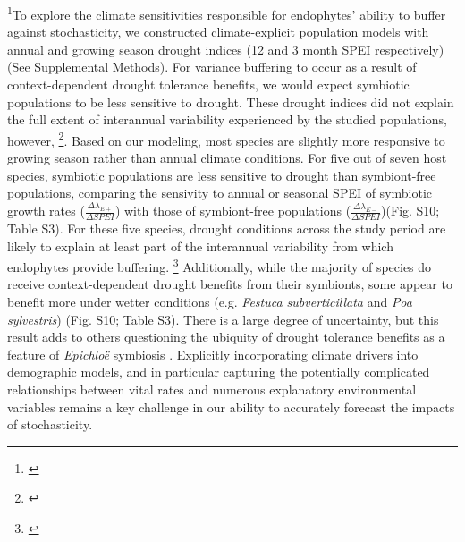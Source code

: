 \documentclass[12pt]{article}
\newcommand{\tom}[2]{{\color{red}{#1}}\footnote{\textit{\color{red}{#2}}}}
\newcommand{\josh}[2]{{\color{blue}{#1}}\footnote{\textit{\color{blue}{#2}}}}
\begin{document}
\tom{}{We can talk more about it, but I might reduce this paragraph and incorporate its key points into the sections above. For example, where you first describe the buffering result, you can say that climate-explicit analyses indicate that S+ populations are less sensitive to drought conditions than S- for five of seven species, then reference the supplement.}To explore the climate sensitivities responsible for endophytes' ability to buffer against stochasticity, we constructed climate-explicit population models with annual and growing season drought indices (12 and 3 month SPEI respectively) (See Supplemental Methods). 
For variance buffering to occur as a result of context-dependent drought tolerance benefits, we would expect symbiotic populations to be less sensitive to drought. 
These drought indices did not explain the full extent of interannual variability experienced by the studied populations, however, \tom{some interesting patterns emerged}{not very compelling}.
Based on our modeling, most species are slightly more responsive to growing season rather than annual climate conditions.
For five out of seven host species, symbiotic populations are less sensitive to drought than symbiont-free populations, comparing the sensivity to annual or seasonal SPEI of symbiotic growth rates ($\frac{\Delta\lambda_{E+}}{\Delta SPEI}$) with those of symbiont-free populations ($\frac{\Delta\lambda_{E-}}{\Delta SPEI}$)(Fig. S10; Table S3). 
For these five species, drought conditions across the study period are likely to explain at least part of the interannual variability from which endophytes provide buffering.
\josh{We did not find a strong relationship between the the magnitude of buffering effects and relative climate sensitivities.}{Not sure what to say about this. There's not really any clear pattern expect that most of the species have at least either growing season or annual drought conditions where the E- are more sensitive, and so variance buffering is possible. But there's not relationship between the magnitude of the difference in sensitivity to the magnitude of variance buffering effect. I have a plot for this, but basically, it's plotting the ratios in table S2 and the effect on CV}
Additionally, while the majority of species do receive context-dependent drought benefits from their symbionts, some appear to benefit more under wetter conditions (e.g. \emph{Festuca subverticillata} and \emph{Poa sylvestris}) (Fig. S10; Table S3). 
There is a large degree of uncertainty, but this result adds to others questioning the ubiquity of drought tolerance benefits as a feature of \emph{Epichlo\"e} symbiosis \cite{decunta2021systematic}. 
Explicitly incorporating climate drivers into demographic models, and in particular capturing the potentially complicated relationships between vital rates and numerous explanatory environmental variables remains a key challenge in our ability to accurately forecast the impacts of stochasticity.
\end{document}
